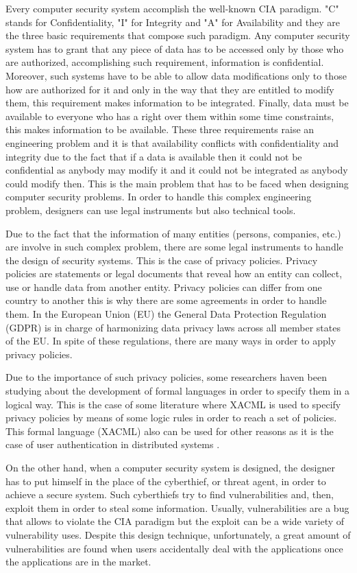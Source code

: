 Every computer security system accomplish the well-known CIA paradigm. "C" stands for Confidentiality, "I" for Integrity and "A" for Availability and they are the three basic requirements that compose such paradigm. Any computer security system has to grant that any piece of data has to be accessed only by those who are authorized, accomplishing such requirement, information is confidential. Moreover, such systems have to be able to allow data modifications only to those how are authorized for it and only in the way that they are entitled to modify them, this requirement makes information to be integrated. Finally, data must be available to everyone who has a right over them within some time constraints, this makes information to be available. These three requirements raise an engineering problem and it is that availability conflicts with confidentiality and integrity due to the fact that if a data is available then it could not be confidential as anybody may modify it and it could not be integrated as anybody could modify then. This is the main problem that has to be faced when designing computer security problems. In order to handle this complex engineering problem, designers can use legal instruments but also technical tools.

Due to the fact that the information of many entities (persons, companies, etc.) are involve in such complex problem, there are some legal instruments to handle the design of security systems. This is the case of privacy policies. Privacy policies are statements or legal documents that reveal how an entity can collect, use or handle data from another entity. Privacy policies can differ from one country to another this is why there are some agreements in order to handle them. In the European Union (EU) the General Data Protection Regulation (GDPR) is in charge of harmonizing data privacy laws across all member states of the EU. In spite of these regulations, there are many ways in order to apply privacy policies.

Due to the importance of such privacy policies, some researchers haven been studying about the development of formal languages in order to specify them in a logical way. This is the case of some literature \cite{XACMLlanguage} where XACML is used to specify privacy policies by means of some logic rules in order to reach a set of policies. This formal language (XACML) also can be used for other reasons as it is the case of user authentication in distributed systems \cite{XACMLforAuthentication}.

On the other hand, when a computer security system is designed, the designer has to put himself in the place of the cyberthief, or threat agent, in order to achieve a secure system. Such cyberthiefs try to find vulnerabilities and, then, exploit them in order to steal some information. Usually, vulnerabilities are a bug that allows to violate the CIA paradigm but the exploit can be a wide variety of vulnerability uses. Despite this design technique, unfortunately, a great amount of vulnerabilities are found when users accidentally deal with the applications once the applications are in the market.

